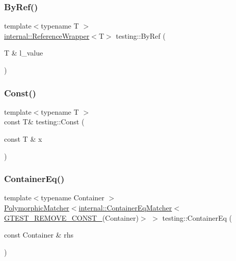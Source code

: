 \mbox{\label{namespacetesting_aaee6d42dcd69de6e7a1459c5c71222c3}} 
\subsubsection{\texorpdfstring{By\+Ref()}{ByRef()}}
{\footnotesize\ttfamily template$<$typename T $>$ \\
\hyperlink{classtesting_1_1internal_1_1_reference_wrapper}{internal\+::\+Reference\+Wrapper}$<$T$>$ testing\+::\+By\+Ref (\begin{DoxyParamCaption}\item[{T \&}]{l\+\_\+value }\end{DoxyParamCaption})\hspace{0.3cm}{\ttfamily [inline]}}

\mbox{\label{namespacetesting_a945ac56c5508a3c9c032bbe8aae8dcfa}} 
\subsubsection{\texorpdfstring{Const()}{Const()}}
{\footnotesize\ttfamily template$<$typename T $>$ \\
const T\& testing\+::\+Const (\begin{DoxyParamCaption}\item[{const T \&}]{x }\end{DoxyParamCaption})\hspace{0.3cm}{\ttfamily [inline]}}

\mbox{\label{namespacetesting_a5928ffc4e976a4da981512c422792840}} 
\subsubsection{\texorpdfstring{Container\+Eq()}{ContainerEq()}}
{\footnotesize\ttfamily template$<$typename Container $>$ \\
\hyperlink{classtesting_1_1_polymorphic_matcher}{Polymorphic\+Matcher}$<$\hyperlink{classtesting_1_1internal_1_1_container_eq_matcher}{internal\+::\+Container\+Eq\+Matcher}$<$ \hyperlink{gtest-internal_8h_a2ffec8c60510eb130af387f5ce9a756a}{G\+T\+E\+S\+T\+\_\+\+R\+E\+M\+O\+V\+E\+\_\+\+C\+O\+N\+S\+T\+\_\+}(Container)$>$ $>$ testing\+::\+Container\+Eq (\begin{DoxyParamCaption}\item[{const Container \&}]{rhs }\end{DoxyParamCaption})\hspace{0.3cm}{\ttfamily [inline]}}

